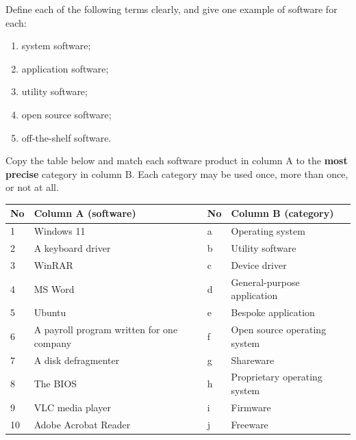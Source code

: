 \documentclass[11pt]{article}
\newcounter{popsec}
\newcounter{popsub}
\newcommand{\courssub}[1]{%
  \stepcounter{popsub}%
  \par\vspace{9pt}\noindent{\popxbold\fontsize{11.5}{13}\selectfont\color{popink}{\color{poporange}\thepopsec.\thepopsub}\hspace{6pt}#1}\par\nopagebreak\vspace{4pt}
}
\begin{document}
\begin{exercice}
Define each of the following terms clearly, and give one example of software for each:
\begin{enumerate}
\item system software;
\item application software;
\item utility software;
\item open source software;
\item off-the-shelf software.
\end{enumerate}
\end{exercice}

\begin{exercice}
Copy the table below and match each software product in column A to the \textbf{most precise} category in column B. Each category may be used once, more than once, or not at all.
\begin{center}
\begin{tabularx}{\linewidth}{|l|X|l|X|}
\hline
\rowcolor{popblueL} \textbf{No} & \textbf{Column A (software)} & \textbf{No} & \textbf{Column B (category)} \\
\hline
1 & Windows 11 & a & Operating system \\
\hline
2 & A keyboard driver & b & Utility software \\
\hline
3 & WinRAR & c & Device driver \\
\hline
4 & MS Word & d & General-purpose application \\
\hline
5 & Ubuntu & e & Bespoke application \\
\hline
6 & A payroll program written for one company & f & Open source operating system \\
\hline
7 & A disk defragmenter & g & Shareware \\
\hline
8 & The BIOS & h & Proprietary operating system \\
\hline
9 & VLC media player & i & Firmware \\
\hline
10 & Adobe Acrobat Reader & j & Freeware \\
\hline
\end{tabularx}
\end{center}
\end{exercice}

\courssub{I practise}
\end{document}
